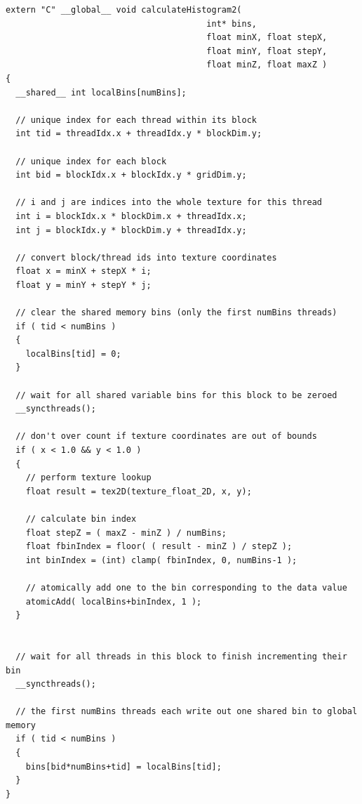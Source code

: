 \documentclass{article}
\begin{document}
\lstset{language=C,basicstyle=\footnotesize}
\begin{minipage}{\textwidth}
\begin{lstlisting}[caption={calculateHistogram2: Shared Memory atomicAdd},label={kernel2}]
extern "C" __global__ void calculateHistogram2(
                                        int* bins,
                                        float minX, float stepX,
                                        float minY, float stepY,
                                        float minZ, float maxZ )
{
  __shared__ int localBins[numBins];

  // unique index for each thread within its block
  int tid = threadIdx.x + threadIdx.y * blockDim.y;

  // unique index for each block
  int bid = blockIdx.x + blockIdx.y * gridDim.y;

  // i and j are indices into the whole texture for this thread
  int i = blockIdx.x * blockDim.x + threadIdx.x;
  int j = blockIdx.y * blockDim.y + threadIdx.y;

  // convert block/thread ids into texture coordinates
  float x = minX + stepX * i;
  float y = minY + stepY * j;

  // clear the shared memory bins (only the first numBins threads)
  if ( tid < numBins )
  {
    localBins[tid] = 0;
  }

  // wait for all shared variable bins for this block to be zeroed
  __syncthreads();

  // don't over count if texture coordinates are out of bounds
  if ( x < 1.0 && y < 1.0 )
  {
    // perform texture lookup
    float result = tex2D(texture_float_2D, x, y);

    // calculate bin index
    float stepZ = ( maxZ - minZ ) / numBins;
    float fbinIndex = floor( ( result - minZ ) / stepZ );
    int binIndex = (int) clamp( fbinIndex, 0, numBins-1 );

    // atomically add one to the bin corresponding to the data value
    atomicAdd( localBins+binIndex, 1 );
  }


  // wait for all threads in this block to finish incrementing their bin
  __syncthreads();

  // the first numBins threads each write out one shared bin to global memory
  if ( tid < numBins )
  {
    bins[bid*numBins+tid] = localBins[tid];
  }
}
\end{lstlisting}
\end{minipage}
\end{document}
